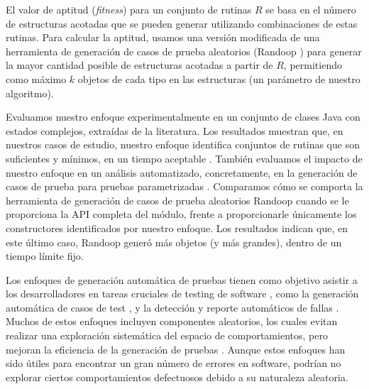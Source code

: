 El valor de aptitud (\emph{fitness}) para un conjunto de rutinas \(R\) se basa en el número de estructuras acotadas que se pueden generar utilizando combinaciones de estas rutinas. Para calcular la aptitud, usamos una versión modificada de una herramienta de generación de casos de prueba aleatorios (Randoop \cite{ref24}) para generar la mayor cantidad posible de estructuras acotadas a partir de \(R\), permitiendo como máximo \(k\) objetos de cada tipo en las estructuras (un parámetro de nuestro algoritmo). 

Evaluamos nuestro enfoque experimentalmente en un conjunto de clases Java con estados complejos, extraídas de la literatura. Los resultados muestran que, en nuestros casos de estudio, nuestro enfoque identifica conjuntos de rutinas que son suficientes y mínimos, en un tiempo aceptable . También evaluamos el impacto de nuestro enfoque en un análisis automatizado, concretamente, en la generación de casos de prueba para pruebas parametrizadas . Comparamos cómo se comporta la herramienta de generación de casos de prueba aleatorios Randoop cuando se le proporciona la API completa del módulo, frente a proporcionarle únicamente los constructores identificados por nuestro enfoque. Los resultados indican que, en este último caso, Randoop generó más objetos (y más grandes), dentro de un tiempo límite fijo.


Los enfoques de generación automática de pruebas tienen como objetivo asistir a los desarrolladores en tareas cruciales de testing de software \cite{Ammann16,Myers11}, como la generación automática de casos de test \cite{Cadar08,Christakis15,Iosif02,Luckow14,Fraser11}, y la detección y reporte automáticos de fallas \cite{Pacheco07, Ma15 , Godefroid05, Marinov01, Boyapati02, Godefroid12}. Muchos de estos enfoques incluyen componentes aleatorios, los cuales evitan realizar una exploración sistemática del espacio de comportamientos, pero mejoran la eficiencia de la generación de pruebas \cite{Pacheco07, Ma15, Fraser11}. Aunque estos enfoques han sido útiles para encontrar un gran número de errores en software, podrían no explorar ciertos comportamientos defectuosos debido a su naturaleza aleatoria. 

